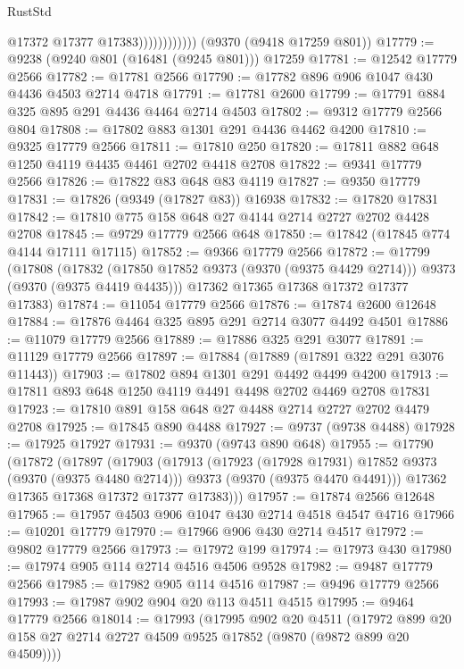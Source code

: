 \begin{lexlean}{RustStd}
\begin{coremodule}
{\begin{coremodule}
{{{{{{{{{{{{{{{{{{{{{{{{{{{{{{{{{{{{{{{                            @17372
                            @17377
                            @17383))))))))))))
    (@9370 (@9418 @17259 @801))
@17779 := @9238 (@9240 @801 (@16481 (@9245 @801))) @17259
@17781 := @12542 @17779 @2566
@17782 := @17781 @2566
@17790 := @17782 @896 @906 @1047 @430 @4436 @4503 @2714 @4718
@17791 := @17781 @2600
@17799 := @17791 @884 @325 @895 @291 @4436 @4464 @2714 @4503
@17802 := @9312 @17779 @2566 @804
@17808 := @17802 @883 @1301 @291 @4436 @4462 @4200
@17810 := @9325 @17779 @2566
@17811 := @17810 @250
@17820 := @17811 @882 @648 @1250 @4119 @4435 @4461 @2702 @4418 @2708
@17822 := @9341 @17779 @2566
@17826 := @17822 @83 @648 @83 @4119
@17827 := @9350 @17779
@17831 := @17826 (@9349 (@17827 @83)) @16938
@17832 := @17820 @17831
@17842 := @17810 @775 @158 @648 @27 @4144 @2714 @2727 @2702 @4428 @2708
@17845 := @9729 @17779 @2566 @648
@17850 := @17842 (@17845 @774 @4144 @17111 @17115)
@17852 := @9366 @17779 @2566
@17872 := @17799
    (@17808
      (@17832 (@17850 @17852 @9373 (@9370 (@9375 @4429 @2714))) @9373 (@9370 (@9375 @4419 @4435)))
      @17362
      @17365
      @17368
      @17372
      @17377
      @17383)
@17874 := @11054 @17779 @2566
@17876 := @17874 @2600 @12648
@17884 := @17876 @4464 @325 @895 @291 @2714 @3077 @4492 @4501
@17886 := @11079 @17779 @2566
@17889 := @17886 @325 @291 @3077
@17891 := @11129 @17779 @2566
@17897 := @17884 (@17889 (@17891 @322 @291 @3076 @11443))
@17903 := @17802 @894 @1301 @291 @4492 @4499 @4200
@17913 := @17811 @893 @648 @1250 @4119 @4491 @4498 @2702 @4469 @2708 @17831
@17923 := @17810 @891 @158 @648 @27 @4488 @2714 @2727 @2702 @4479 @2708
@17925 := @17845 @890 @4488
@17927 := @9737 (@9738 @4488)
@17928 := @17925 @17927
@17931 := @9370 (@9743 @890 @648)
@17955 := @17790
    (@17872
      (@17897
        (@17903
          (@17913
            (@17923 (@17928 @17931) @17852 @9373 (@9370 (@9375 @4480 @2714)))
            @9373
            (@9370 (@9375 @4470 @4491)))
          @17362
          @17365
          @17368
          @17372
          @17377
          @17383)))
@17957 := @17874 @2566 @12648
@17965 := @17957 @4503 @906 @1047 @430 @2714 @4518 @4547 @4716
@17966 := @10201 @17779
@17970 := @17966 @906 @430 @2714 @4517
@17972 := @9802 @17779 @2566
@17973 := @17972 @199
@17974 := @17973 @430
@17980 := @17974 @905 @114 @2714 @4516 @4506 @9528
@17982 := @9487 @17779 @2566
@17985 := @17982 @905 @114 @4516
@17987 := @9496 @17779 @2566
@17993 := @17987 @902 @904 @20 @113 @4511 @4515
@17995 := @9464 @17779 @2566
@18014 := @17993
    (@17995
      @902
      @20
      @4511
      (@17972 @899 @20 @158 @27 @2714 @2727 @4509 @9525 @17852 (@9870 (@9872 @899 @20 @4509))))
}}}}}}}}}}}}}}}}}}}}}}}}}}}}}}}}}}}}}}}
\end{coremodule}}
\end{coremodule}
\end{lexlean}
